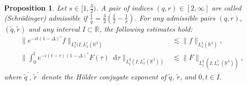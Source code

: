 \documentclass[12pt,a4paper]{amsart}
\newtheorem{prop}[theorem]{Proposition}
\numberwithin{equation}{section}
\newcommand*\diff{\mathop{}\!\mathrm{d}}
\begin{document}
	\begin{prop}\label{prop:strichartz_general_s_geq_1}
		Let $s \in [1,\frac32) $. A pair of indices $(q,r) \in \left[ 2 , \infty \right] $ are called (Schrödinger) admissible if $ \frac{1}{q} = \frac{3}{2}(\frac{1}{2} - \frac{1}{r} ) $. For any admissible pairs $(q,r)$, $(\tilde{q},\tilde{r})$ and any interval $I \subset \mathbb{R} $, the following estimates hold: 
		\begin{align} \label{eq:strichartz_general_s_geq_1}
			\| e^{-it(1-\Delta)^s} f \|_{L^q_t(I;L^r_x(\mathbb{R}^3)} &  \lesssim \| f \|_{L^2_x(\mathbb{R}^3)} , \\
			\Bigg\| \int_{0}^{t} e^{-i(t-\tau)(1-\Delta)^s} F(\tau) \diff \tau \Bigg\|_{L_t^{q}(I;L^r_x(\mathbb{R}^3))} & \lesssim \| F \|_{L^{\tilde{q}^\prime}_t(I;L^{\tilde{r}^\prime}_x(\mathbb{R}^3))},\label{eq:strichartz_general_s_geq_2}
		\end{align}
		where $\tilde{q}^\prime, \, \tilde{r}^\prime $ denote the H\"older conjugate exponent of $\tilde q$, $\tilde r$, and $0,t \in \overline{I}$.
	\end{prop}
\end{document}
